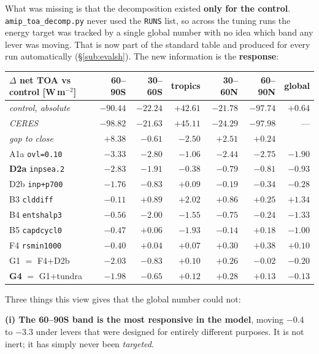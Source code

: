 \documentclass[10pt]{article}
\begin{document}
What was missing is that the decomposition existed \textbf{only for the control}.
\texttt{amip\_toa\_decomp.py} never used the \texttt{RUNS} list, so across the tuning runs the
energy target was tracked by a single global number with no idea which band any lever was
moving. That is now part of the standard table and produced for every run automatically
(\S\ref{sub:evalsh}). The new information is the \textbf{response}:

\begin{center}\footnotesize
\begin{tabular}{l r r r r r r}
\toprule
$\Delta$ net TOA vs control [W\,m$^{-2}$] & 60--90S & 30--60S & tropics & 30--60N & 60--90N & global \\
\midrule
\emph{control, absolute} & $-90.44$ & $-22.24$ & $+42.61$ & $-21.78$ & $-97.74$ & $+0.64$ \\
\emph{CERES} & $-98.82$ & $-21.63$ & $+45.11$ & $-24.29$ & $-97.98$ & --- \\
\emph{gap to close} & $\mathbf{+8.38}$ & $-0.61$ & $-2.50$ & $+2.51$ & $+0.24$ & \\
\midrule
A1a \texttt{ovl=0.10} & $-3.33$ & $-2.80$ & $-1.06$ & $-2.44$ & $-2.75$ & $-1.90$ \\
\textbf{D2a} \texttt{inpsea.2} & $\mathbf{-2.83}$ & $-1.91$ & $-0.38$ & $-0.79$ & $-0.81$ & $-0.93$ \\
D2b \texttt{inp+p700} & $-1.76$ & $-0.83$ & $+0.09$ & $-0.19$ & $-0.34$ & $-0.28$ \\
B3 \texttt{clddiff} & $-0.11$ & $+0.89$ & $\mathbf{+2.02}$ & $+0.86$ & $+0.25$ & $+1.34$ \\
B4 \texttt{entshalp3} & $-0.56$ & $-2.00$ & $-1.55$ & $-0.75$ & $-0.24$ & $-1.33$ \\
B5 \texttt{capdcycl0} & $-0.47$ & $+0.06$ & $\mathbf{-1.93}$ & $-0.14$ & $+0.18$ & $-1.00$ \\
F4 \texttt{rsmin1000} & $-0.40$ & $+0.04$ & $+0.07$ & $+0.30$ & $+0.38$ & $+0.10$ \\
G1 $=$ F4$+$D2b & $-2.03$ & $-0.83$ & $+0.10$ & $+0.26$ & $-0.02$ & $-0.20$ \\
\textbf{G4} $=$ G1$+$tundra & $-1.98$ & $-0.65$ & $+0.12$ & $+0.28$ & $+0.13$ & $-0.13$ \\
\bottomrule
\end{tabular}
\end{center}

\noindent Three things this view gives that the global number could not:

\textbf{(i) The 60--90S band is the most responsive in the model}, moving $-0.4$ to $-3.3$
under levers that were designed for entirely different purposes. It is not inert; it has
simply never been \emph{targeted}.
\end{document}

